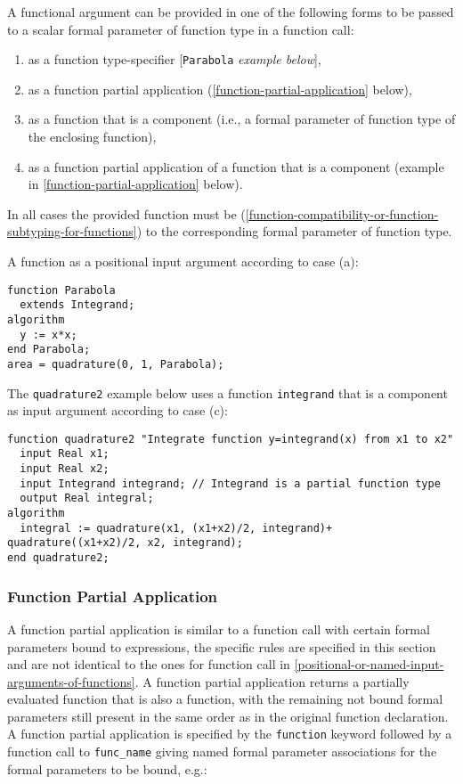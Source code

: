 A functional argument can be provided in one of the following forms to
be passed to a scalar formal parameter of function type in a function
call:

\begin{enumerate}
\def\labelenumi{\alph{enumi})}
\item
  as a function type-specifier {[}\lstinline!Parabola! \emph{example below}{]},
\item
  as a function partial application (\autoref{function-partial-application} below),
\item
  as a function that is a component (i.e., a formal parameter of function type of the enclosing function),
\item
  as a function partial application of a function that is a component
  (example in \autoref{function-partial-application} below).
\end{enumerate}

In all cases the provided function must be 
(\autoref{function-compatibility-or-function-subtyping-for-functions}) to the corresponding formal parameter of function type.

\begin{example}
A function as a positional input argument according to case (a):
\begin{lstlisting}[language=modelica]
function Parabola
  extends Integrand;
algorithm
  y := x*x;
end Parabola;
area = quadrature(0, 1, Parabola);
\end{lstlisting}
The \lstinline!quadrature2! example below uses a function \lstinline!integrand! that is a
component as input argument according to case (c):
\begin{lstlisting}[language=modelica]
  function quadrature2 "Integrate function y=integrand(x) from x1 to x2"
  input Real x1;
  input Real x2;
  input Integrand integrand; // Integrand is a partial function type
  output Real integral;
algorithm
  integral := quadrature(x1, (x1+x2)/2, integrand)+  quadrature((x1+x2)/2, x2, integrand);
end quadrature2;
\end{lstlisting}
\end{example}

\subsubsection{Function Partial Application}

A function partial application is similar to a function call with
certain formal parameters bound to expressions, the specific rules are
specified in this section and are not identical to the ones for function
call in \autoref{positional-or-named-input-arguments-of-functions}. A function partial application returns a partially
evaluated function that is also a function, with the remaining not bound
formal parameters still present in the same order as in the original
function declaration. A function partial application is specified by the
\lstinline!function! keyword followed by a function call to \lstinline!func_name!
giving named formal parameter associations for the formal parameters to
be bound, e.g.:

